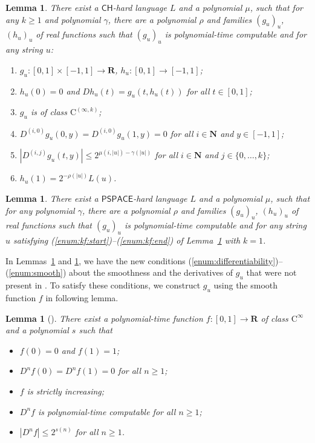 \documentclass[12pt,a4paper]{article}
\newtheorem{lemma}[theorem]{Lemma}
\theoremstyle{definition}
\theoremstyle{remark}
\newcommand{\R}{\mathbf R}
\newcommand{\N}{\mathbf N}
\newcommand{\D}{D}
\newcommand{\classPSPACE}{\mathsf{PSPACE}}
\newcommand{\classCH}{\mathsf{CH}}
\newcommand{\classC}{\mathrm C}
\begin{document}
 \begin{lemma}
  \label{KTimesFamily}
  There exist a $\classCH$-hard language $L$ and a polynomial $\mu$,
  such that for any $k \ge 1$ and polynomial $\gamma$,
  there are a polynomial $\rho$ and families $(g_u)_u$, $(h_u)_u$ of real functions
  such that $(g_u)_u$ is polynomial-time computable and for any string $u$:
  \begin{enumerate}
   \item \label{enum:kf:start}
	 $g_u\colon [0,1] \times [-1,1]\to \R$, $h_u\colon [0,1] \to [-1,1]$;
   \item \label{enum:equation}
	 $h_u(0) = 0$ and $\D h_u(t) = g_u(t, h_u(t))$ for all $t \in [0,1]$;
   \item \label{enum:differentiability}
         $g_u$ is of class $\classC^{(\infty, k)}$;
   \item \label{enum:boundary}
	 $
	 \D^{(i, 0)} g_u(0,y) = \D^{(i, 0)} g_u(1,y) = 0
         $ for all $i \in \N$ and $y \in [-1,1]$;
   \item \label{enum:smooth}
	 $
	 \left|\D^{(i,j)} g_u(t,y)\right| \le 2^{\mu(i, |u|) - \gamma(|u|)}
         $ for all $i \in \N$ and $j \in \{0, \dots, k\}$;
   \item \label{enum:kf:end}
	 $h_u(1) = 2^{-\rho(|u|)} L(u)$.
  \end{enumerate}
 \end{lemma}

\begin{lemma}
 \label{DifferentiableFamily}
 There exist a $\classPSPACE$-hard language $L$ and a polynomial $\mu$,
 such that for any polynomial $\gamma$,
 there are a polynomial $\rho$ and families $(g_u)_u$, $(h_u)_u$ of real functions
 such that $(g_u)_u$ is polynomial-time computable and for any string $u$
 satisfying (\ref{enum:kf:start})--(\ref{enum:kf:end}) of Lemma~\ref{KTimesFamily} with $k = 1$.
\end{lemma}


In Lemmas~\ref{KTimesFamily} and \ref{DifferentiableFamily}, 
we have the new conditions (\ref{enum:differentiability})--(\ref{enum:smooth})
about the smoothness and the derivatives of $g_u$ 
that were not present in \cite[Lemma 4.1]{kawamura2010lipschitz}.
To satisfy these conditions,
we construct $g_u$ using the smooth function $f$ in following lemma.

\begin{lemma}[{\cite[Lemma 3.6]{ko1991complexity}}]
 \label{SmoothFunction}
 There exist 
 a polynomial-time function $f \colon [0, 1] \to \R$ of class $\classC^\infty$ and 
 a polynomial $s$ such that
  \begin{itemize}
   \item $f(0) = 0$ and $f(1) = 1$;
   \item $\D ^n f (0) = \D ^n f (1) = 0$ for all $n \ge 1$;
   \item $f$ is strictly increasing;
   \item $\D ^n f$ is polynomial-time computable for all $n \ge 1$;
   \item $|\D^n f| \le 2^{s(n)}$ for all $n \ge 1$. 
  \end{itemize}
 \end{lemma}
\end{document}
